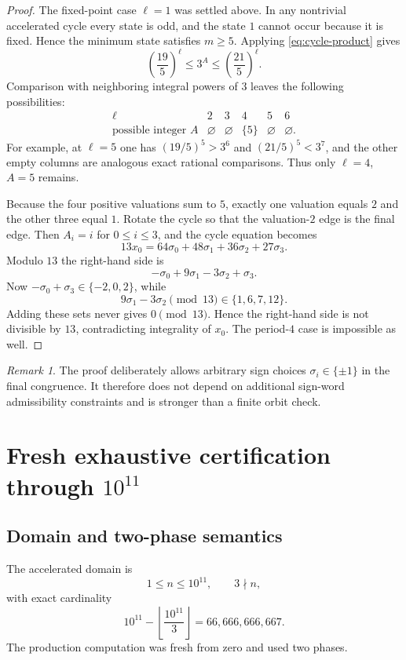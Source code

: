 \documentclass[11pt]{article}
\theoremstyle{definition}
\theoremstyle{remark}
\newtheorem{remark}[theorem]{Remark}
\begin{document}
\begin{proof}
The fixed-point case $\ell=1$ was settled above.  In any nontrivial accelerated cycle every state is odd, and the state $1$ cannot occur because it is fixed.  Hence the minimum state satisfies $m\ge5$.  Applying \eqref{eq:cycle-product} gives
\[
\left(\frac{19}{5}\right)^\ell
\le 3^A\le
\left(\frac{21}{5}\right)^\ell.
\]
Comparison with neighboring integral powers of $3$ leaves the following possibilities:
\[
\begin{array}{c|ccccc}
\ell&2&3&4&5&6\\ \hline
\text{possible integer }A&\varnothing&\varnothing&\{5\}&\varnothing&\varnothing.
\end{array}
\]
For example, at $\ell=5$ one has $(19/5)^5>3^6$ and $(21/5)^5<3^7$, and the other empty columns are analogous exact rational comparisons.  Thus only $\ell=4$, $A=5$ remains.

Because the four positive valuations sum to $5$, exactly one valuation equals $2$ and the other three equal $1$.  Rotate the cycle so that the valuation-$2$ edge is the final edge.  Then $A_i=i$ for $0\le i\le3$, and the cycle equation becomes
\[
13x_0
=
64\sigma_0+48\sigma_1+36\sigma_2+27\sigma_3.
\]
Modulo $13$ the right-hand side is
\[
-\sigma_0+9\sigma_1-3\sigma_2+\sigma_3.
\]
Now $-\sigma_0+\sigma_3\in\{-2,0,2\}$, while
\[
9\sigma_1-3\sigma_2\pmod{13}\in\{1,6,7,12\}.
\]
Adding these sets never gives $0\pmod{13}$.  Hence the right-hand side is not divisible by $13$, contradicting integrality of $x_0$.  The period-$4$ case is impossible as well.
\end{proof}

\begin{remark}
The proof deliberately allows arbitrary sign choices $\sigma_i\in\{\pm1\}$ in the final congruence.  It therefore does not depend on additional sign-word admissibility constraints and is stronger than a finite orbit check.
\end{remark}

\section{Fresh exhaustive certification through $10^{11}$}

\subsection{Domain and two-phase semantics}

The accelerated domain is
\[
1\le n\le10^{11},\qquad 3\nmid n,
\]
with exact cardinality
\begin{equation}
10^{11}-\left\lfloor\frac{10^{11}}3\right\rfloor
=66{,}666{,}666{,}667.
\label{eq:domain-cardinality}
\end{equation}
The production computation was fresh from zero and used two phases.
\end{document}

